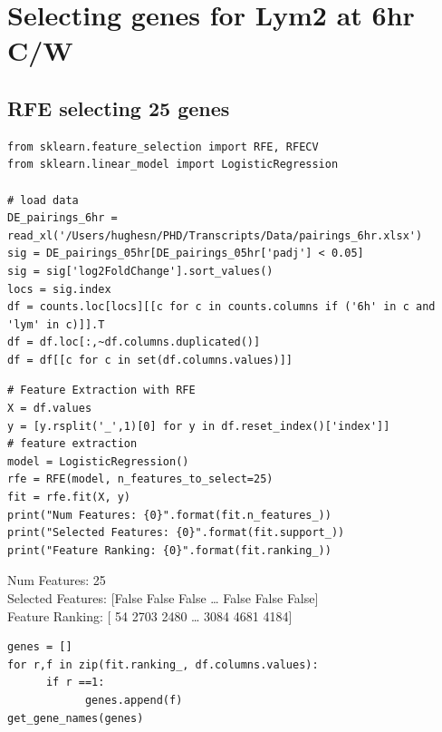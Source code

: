 \documentclass[11pt]{article}
\begin{document}
\section{Selecting genes for Lym2 at 6hr C/W}
\label{sec:org1a7bf55}
\subsection{RFE selecting 25 genes}
\label{sec:orgf2dd900}
\begin{verbatim}
from sklearn.feature_selection import RFE, RFECV
from sklearn.linear_model import LogisticRegression

# load data
DE_pairings_6hr = read_xl('/Users/hughesn/PHD/Transcripts/Data/pairings_6hr.xlsx')
sig = DE_pairings_05hr[DE_pairings_05hr['padj'] < 0.05]
sig = sig['log2FoldChange'].sort_values()
locs = sig.index
df = counts.loc[locs][[c for c in counts.columns if ('6h' in c and 'lym' in c)]].T
df = df.loc[:,~df.columns.duplicated()]
df = df[[c for c in set(df.columns.values)]]
\end{verbatim}

\begin{verbatim}
# Feature Extraction with RFE
X = df.values
y = [y.rsplit('_',1)[0] for y in df.reset_index()['index']]
# feature extraction
model = LogisticRegression()
rfe = RFE(model, n_features_to_select=25)
fit = rfe.fit(X, y)
print("Num Features: {0}".format(fit.n_features_))
print("Selected Features: {0}".format(fit.support_))
print("Feature Ranking: {0}".format(fit.ranking_))
\end{verbatim}

Num Features: 25\\
Selected Features: [False False False \ldots{} False False False]\\
Feature Ranking: [  54 2703 2480 \ldots{} 3084 4681 4184]\\


\begin{verbatim}
genes = []
for r,f in zip(fit.ranking_, df.columns.values):
      if r ==1:
            genes.append(f)
get_gene_names(genes)
\end{verbatim}
\end{document}
